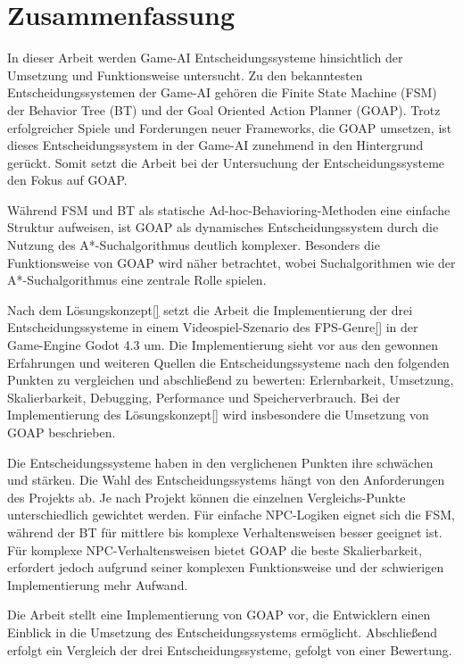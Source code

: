 \chapter{Zusammenfassung}
\label{chap:zusammenfassung}

In dieser Arbeit werden Game-AI Entscheidungssysteme hinsichtlich der Umsetzung und Funktionsweise untersucht. Zu den bekanntesten Entscheidungssystemen der Game-AI geh\"{o}ren die Finite State Machine (FSM) der Behavior Tree (BT) und der Goal Oriented Action Planner (GOAP). Trotz erfolgreicher Spiele und Forderungen neuer Frameworks, die GOAP umsetzen, ist dieses Entscheidungssystem in der Game-AI zunehmend in den Hintergrund ger\"{u}ckt. Somit setzt die Arbeit bei der Untersuchung der Entscheidungssysteme den Fokus auf GOAP.

W\"{a}hrend FSM und BT als statische Ad-hoc-Behavioring-Methoden eine einfache Struktur aufweisen, ist GOAP als dynamisches Entscheidungssystem durch die Nutzung des A*-Suchalgorithmus deutlich komplexer. Besonders die Funktionsweise von GOAP wird n\"{a}her betrachtet, wobei Suchalgorithmen wie der A*-Suchalgorithmus eine zentrale Rolle spielen.

Nach dem L\"{o}sungskonzept\ref{} setzt die Arbeit die Implementierung der drei Entscheidungssysteme in einem Videospiel-Szenario des FPS-Genre\ref{} in der Game-Engine Godot 4.3 um. Die Implementierung sieht vor aus den gewonnen Erfahrungen und weiteren Quellen die Entscheidungssysteme nach den folgenden Punkten zu vergleichen und abschlie\ss{}end zu bewerten: Erlernbarkeit, Umsetzung, Skalierbarkeit, Debugging, Performance und Speicherverbrauch. Bei der Implementierung des L\"{o}sungskonzept\ref{} wird insbesondere die Umsetzung von GOAP beschrieben.

Die Entscheidungssysteme haben in den verglichenen Punkten ihre schw\"{a}chen und st\"{a}rken. Die Wahl des Entscheidungssystems h\"{a}ngt von den Anforderungen des Projekts ab. Je nach Projekt k\"{o}nnen die einzelnen Vergleichs-Punkte unterschiedlich gewichtet werden. F\"{u}r einfache NPC-Logiken eignet sich die FSM, w\"{a}hrend der BT f\"{u}r mittlere bis komplexe Verhaltensweisen besser geeignet ist. F\"{u}r komplexe NPC-Verhaltensweisen bietet GOAP die beste Skalierbarkeit, erfordert jedoch aufgrund seiner komplexen Funktionsweise und der schwierigen Implementierung mehr Aufwand.

Die Arbeit stellt eine Implementierung von GOAP vor, die Entwicklern einen Einblick in die Umsetzung des Entscheidungssystems erm\"{o}glicht. Abschlie\ss{}end erfolgt ein Vergleich der drei Entscheidungssysteme, gefolgt von einer Bewertung.